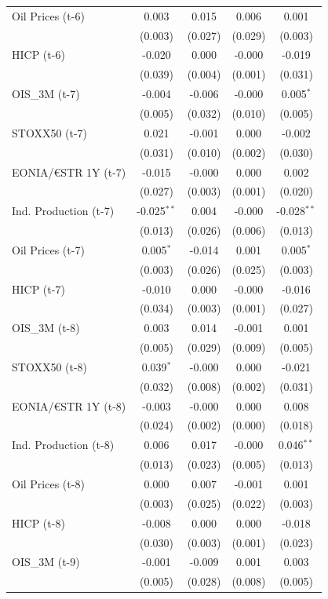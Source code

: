 \begin{longtable}[t]{lcccc}
Oil Prices (t-6) & 0.003 & 0.015 & 0.006 & 0.001\\
 & (0.003) & (0.027) & (0.029) & (0.003)\\
HICP (t-6) & -0.020 & 0.000 & -0.000 & -0.019\\
 & (0.039) & (0.004) & (0.001) & (0.031)\\
OIS\_3M (t-7) & -0.004 & -0.006 & -0.000 & 0.005$^{*}$\\
 & (0.005) & (0.032) & (0.010) & (0.005)\\
STOXX50 (t-7) & 0.021 & -0.001 & 0.000 & -0.002\\
 & (0.031) & (0.010) & (0.002) & (0.030)\\
EONIA/€STR 1Y (t-7) & -0.015 & -0.000 & 0.000 & 0.002\\
 & (0.027) & (0.003) & (0.001) & \vphantom{1} (0.020)\\
Ind. Production (t-7) & -0.025$^{**}$ & 0.004 & -0.000 & -0.028$^{**}$\\
 & (0.013) & (0.026) & (0.006) & (0.013)\\
Oil Prices (t-7) & 0.005$^{*}$ & -0.014 & 0.001 & 0.005$^{*}$\\
 & (0.003) & (0.026) & (0.025) & (0.003)\\
HICP (t-7) & -0.010 & 0.000 & -0.000 & -0.016\\
 & (0.034) & (0.003) & (0.001) & (0.027)\\
OIS\_3M (t-8) & 0.003 & 0.014 & -0.001 & 0.001\\
 & (0.005) & (0.029) & (0.009) & (0.005)\\
STOXX50 (t-8) & 0.039$^{*}$ & -0.000 & 0.000 & -0.021\\
 & (0.032) & (0.008) & (0.002) & (0.031)\\
EONIA/€STR 1Y (t-8) & -0.003 & -0.000 & 0.000 & 0.008\\
 & (0.024) & (0.002) & (0.000) & (0.018)\\
Ind. Production (t-8) & 0.006 & 0.017 & -0.000 & 0.046$^{**}$\\
 & (0.013) & (0.023) & (0.005) & (0.013)\\
Oil Prices (t-8) & 0.000 & 0.007 & -0.001 & 0.001\\
 & (0.003) & (0.025) & (0.022) & (0.003)\\
HICP (t-8) & -0.008 & 0.000 & 0.000 & -0.018\\
 & (0.030) & (0.003) & (0.001) & (0.023)\\
OIS\_3M (t-9) & -0.001 & -0.009 & 0.001 & 0.003\\
 & (0.005) & (0.028) & (0.008) & (0.005)\\

\end{longtable}
